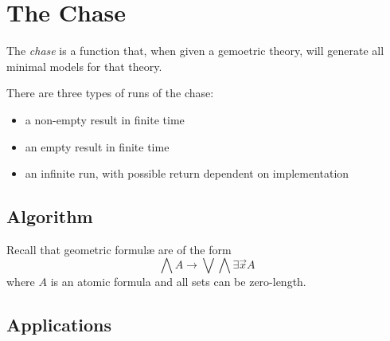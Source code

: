 \section{The Chase}

	The \emph{chase} is a function that, when given a gemoetric theory, will
	generate all minimal models for that theory.

	There are three types of runs of the chase:
	\begin{itemize}
	\item a non-empty result in finite time
	\item an empty result in finite time
	\item an infinite run, with possible return dependent on implementation
	\end{itemize}

	\subsection{Algorithm}

	Recall that geometric formul{\ae} are of the form
	\[\bigwedge A \to \bigvee \bigwedge \exists \vec{x} A\]
	where $A$ is an atomic formula and all sets can be zero-length.

	\subsection{Applications}
